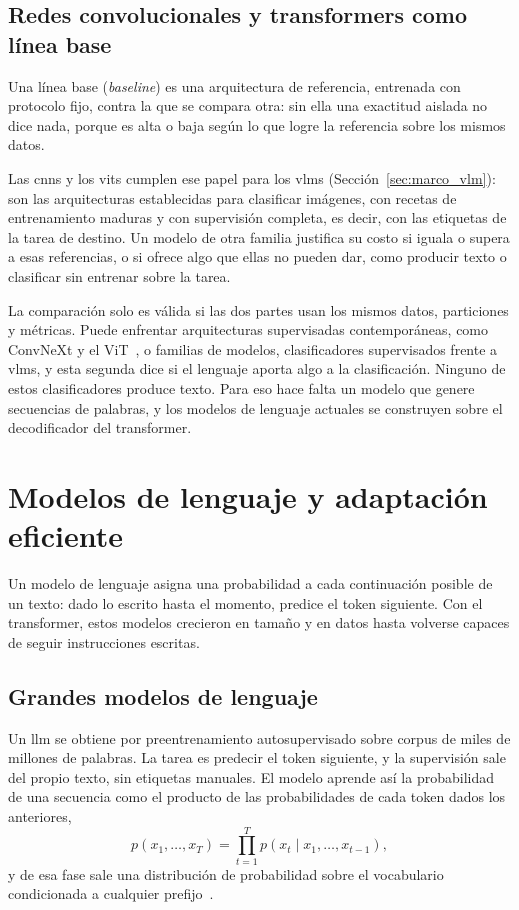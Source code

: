 \subsection{Redes convolucionales y transformers como línea base}
\label{sec:marco_baseline_visual}

Una línea base (\emph{baseline}) es una arquitectura de referencia, entrenada con protocolo fijo, contra la
que se compara otra: sin ella una exactitud aislada no dice nada, porque es alta o baja según lo que logre la
referencia sobre los mismos datos.

Las \glspl{cnn} y los \glspl{vit} cumplen ese papel para los \glspl{vlm}
(Sección~\ref{sec:marco_vlm}): son las arquitecturas establecidas para clasificar imágenes, con recetas de
entrenamiento maduras y con supervisión completa, es decir, con las etiquetas de la tarea de destino. Un
modelo de otra familia justifica su costo si iguala o supera a esas referencias, o si ofrece algo que ellas
no pueden dar, como producir texto o clasificar sin entrenar sobre la tarea.

La comparación solo es válida si las dos partes usan los mismos datos, particiones y métricas. Puede
enfrentar arquitecturas supervisadas contemporáneas, como ConvNeXt y el
ViT~\cite{dosovitskiy2021image,liu2022convnet}, o familias de modelos, clasificadores supervisados frente a
\glspl{vlm}, y esta segunda dice si el lenguaje aporta algo a la clasificación. Ninguno de estos
clasificadores produce texto. Para eso hace falta un modelo que genere secuencias de palabras, y los modelos de
lenguaje actuales se construyen sobre el decodificador del transformer.

\section{Modelos de lenguaje y adaptación eficiente}
\label{sec:marco_llm}

Un modelo de lenguaje asigna una probabilidad a cada continuación posible de un texto: dado lo escrito
hasta el momento, predice el token siguiente. Con el transformer, estos modelos crecieron en tamaño y en
datos hasta volverse capaces de seguir instrucciones escritas.

\subsection{Grandes modelos de lenguaje}
\label{sec:marco_llm_grandes}

Un \gls{llm} se obtiene por preentrenamiento autosupervisado sobre corpus de miles de millones de
palabras. La tarea es predecir el token siguiente, y la supervisión sale del propio texto, sin etiquetas
manuales. El modelo aprende así la probabilidad de una secuencia como el producto de las probabilidades de
cada token dados los anteriores,
\begin{equation}
    p(x_1, \dots, x_T) = \prod_{t=1}^{T} p(x_t \mid x_1, \dots, x_{t-1}),
    \label{eq:marco_lm}
\end{equation}
y de esa fase sale una distribución de probabilidad sobre el vocabulario condicionada a cualquier
prefijo~\cite{brown2020language,touvron2023llama}.

